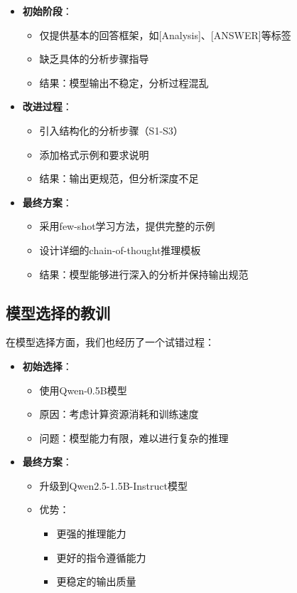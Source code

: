 \documentclass[a4paper, 12pt]{article}
\begin{document}
\begin{itemize}
    \item \textbf{初始阶段}：
        \begin{itemize}
            \item 仅提供基本的回答框架，如[Analysis]、[ANSWER]等标签
            \item 缺乏具体的分析步骤指导
            \item 结果：模型输出不稳定，分析过程混乱
        \end{itemize}
    
    \item \textbf{改进过程}：
        \begin{itemize}
            \item 引入结构化的分析步骤（S1-S3）
            \item 添加格式示例和要求说明
            \item 结果：输出更规范，但分析深度不足
        \end{itemize}
    
    \item \textbf{最终方案}：
        \begin{itemize}
            \item 采用few-shot学习方法，提供完整的示例
            \item 设计详细的chain-of-thought推理模板
            \item 结果：模型能够进行深入的分析并保持输出规范
        \end{itemize}
\end{itemize}

\subsection{模型选择的教训}
在模型选择方面，我们也经历了一个试错过程：

\begin{itemize}
    \item \textbf{初始选择}：
        \begin{itemize}
            \item 使用Qwen-0.5B模型
            \item 原因：考虑计算资源消耗和训练速度
            \item 问题：模型能力有限，难以进行复杂的推理
        \end{itemize}
    
    \item \textbf{最终方案}：
        \begin{itemize}
            \item 升级到Qwen2.5-1.5B-Instruct模型
            \item 优势：
                \begin{itemize}
                    \item 更强的推理能力
                    \item 更好的指令遵循能力
                    \item 更稳定的输出质量
                \end{itemize}
        \end{itemize}
\end{itemize}
\end{document}
